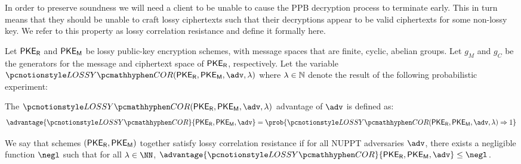 In order to preserve soundness we will need a client to be unable to cause the PPB decryption process to terminate early.
This in turn means that they should be unable to craft lossy ciphertexts such that their decryptions appear to be valid ciphertexts for some non-lossy key. We refer to this property as lossy correlation resistance and define it formally here.

\begin{definition}
	Let ${{\mathsf{PKE}_{{\mathsf{R}}}}}$ and ${{\mathsf{PKE}_{{\mathsf{M}}}}}$ be lossy public-key encryption schemes, with message spaces that are finite, cyclic, abelian groups.
	Let $g_M$ and $g_C$ be the generators for the message and ciphertext space of ${{\mathsf{PKE}_{{\mathsf{R}}}}}$, respectively.
	Let the variable $\badcorgame(\pker, \pkem, \adv, \secpar)$ where $\lambda \in \mathbb{N}$ denote the result of the following probabilistic experiment:


	The $\badcorgame(\pker, \pkem, \adv, \lambda)$ advantage of $\adv$ is defined as:
	$$
		\advantage{\badcorgame}{\pker, \pkem, \adv} = \prob{\badcorgame(\pker, \pkem, \adv, \secpar) \Rightarrow 1}
	$$

	We say that schemes $({{\mathsf{PKE}_{{\mathsf{R}}}}}, {{\mathsf{PKE}_{{\mathsf{M}}}}})$ together satisfy lossy correlation resistance if for all NUPPT adversaries $\adv$, there exists a negligible function $\negl$ such that for all $\secpar \in \NN$, $\advantage{\badcorgame}{\pker, \pkem, \adv} \leq \negl$.
\end{definition}
